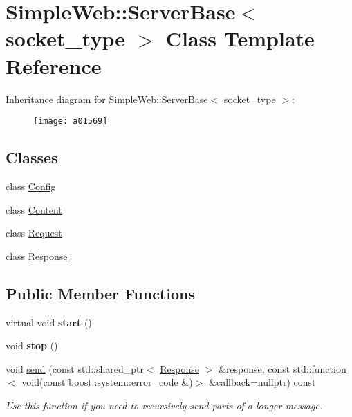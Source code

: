 \hypertarget{a01569}{}\section{Simple\+Web\+:\+:Server\+Base$<$ socket\+\_\+type $>$ Class Template Reference}
\label{a01569}
Inheritance diagram for Simple\+Web\+:\+:Server\+Base$<$ socket\+\_\+type $>$\+:\begin{figure}[H]
\begin{center}
\leavevmode
\texttt{[image: a01569]}
\end{center}
\end{figure}
\subsection*{Classes}
\begin{DoxyCompactItemize}
\item 
class \hyperlink{a01585}{Config}
\item 
class \hyperlink{a01577}{Content}
\item 
class \hyperlink{a01581}{Request}
\item 
class \hyperlink{a01573}{Response}
\end{DoxyCompactItemize}
\subsection*{Public Member Functions}
\begin{DoxyCompactItemize}
\item 
\mbox{\label{a01569_a759d6dae5fa77c47a36f7355fd33f8f7}} 
virtual void {\bfseries start} ()
\item 
\mbox{\label{a01569_a0667e44595f6c23016bee67c646ccc85}} 
void {\bfseries stop} ()
\item 
\mbox{\label{a01569_a93fd842b1a02dd63716ff0718f6069ce}} 
void \hyperlink{a01569_a93fd842b1a02dd63716ff0718f6069ce}{send} (const std\+::shared\+\_\+ptr$<$ \hyperlink{a01573}{Response} $>$ \&response, const std\+::function$<$ void(const boost\+::system\+::error\+\_\+code \&)$>$ \&callback=nullptr) const
\begin{DoxyCompactList}\small\item\em Use this function if you need to recursively send parts of a longer message. \end{DoxyCompactList}\end{DoxyCompactItemize}
